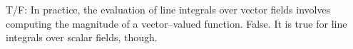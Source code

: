 {T/F: In practice, the evaluation of line integrals over vector fields involves computing the magnitude of a vector--valued function.
}
{False. It is true for line integrals over scalar fields, though.
}
